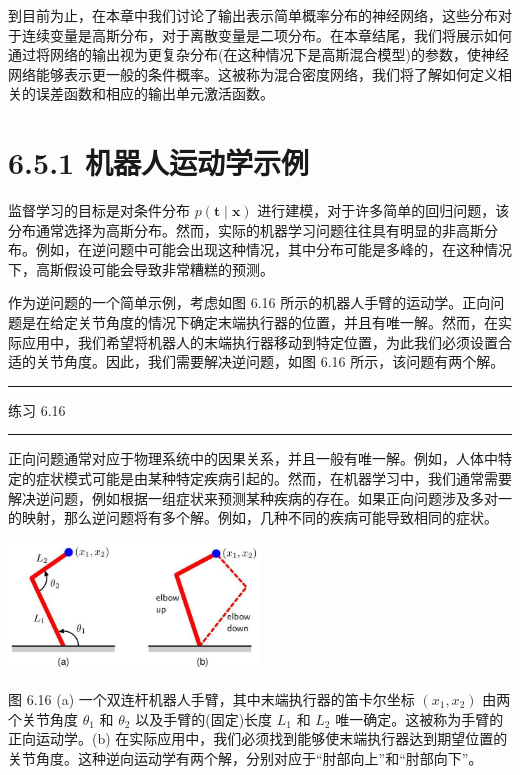 \documentclass[10pt]{article}
\newcommand{\HRule}{\begin{center}\rule{0.9\linewidth}{0.2mm}\end{center}}
\begin{document}
到目前为止，在本章中我们讨论了输出表示简单概率分布的神经网络，这些分布对于连续变量是高斯分布，对于离散变量是二项分布。在本章结尾，我们将展示如何通过将网络的输出视为更复杂分布(在这种情况下是高斯混合模型)的参数，使神经网络能够表示更一般的条件概率。这被称为混合密度网络，我们将了解如何定义相关的误差函数和相应的输出单元激活函数。

\section*{6.5.1 机器人运动学示例}

监督学习的目标是对条件分布 \(p\left( {\mathbf{t} \mid  \mathbf{x}}\right)\) 进行建模，对于许多简单的回归问题，该分布通常选择为高斯分布。然而，实际的机器学习问题往往具有明显的非高斯分布。例如，在逆问题中可能会出现这种情况，其中分布可能是多峰的，在这种情况下，高斯假设可能会导致非常糟糕的预测。

作为逆问题的一个简单示例，考虑如图 6.16 所示的机器人手臂的运动学。正向问题是在给定关节角度的情况下确定末端执行器的位置，并且有唯一解。然而，在实际应用中，我们希望将机器人的末端执行器移动到特定位置，为此我们必须设置合适的关节角度。因此，我们需要解决逆问题，如图 6.16 所示，该问题有两个解。

\HRule

练习 6.16

\HRule

正向问题通常对应于物理系统中的因果关系，并且一般有唯一解。例如，人体中特定的症状模式可能是由某种特定疾病引起的。然而，在机器学习中，我们通常需要解决逆问题，例如根据一组症状来预测某种疾病的存在。如果正向问题涉及多对一的映射，那么逆问题将有多个解。例如，几种不同的疾病可能导致相同的症状。

\begin{center}
\includegraphics[max width=0.5\textwidth]{images/0194e279-9b28-703a-88f4-c3ac21e2010d_218_698_343_718_369_0.jpg}
\end{center}
\hspace*{3em} 

图 6.16 (a) 一个双连杆机器人手臂，其中末端执行器的笛卡尔坐标 \(\left( {{x}_{1},{x}_{2}}\right)\) 由两个关节角度 \({\theta }_{1}\) 和 \({\theta }_{2}\) 以及手臂的(固定)长度 \({L}_{1}\) 和 \({L}_{2}\) 唯一确定。这被称为手臂的正向运动学。(b) 在实际应用中，我们必须找到能够使末端执行器达到期望位置的关节角度。这种逆向运动学有两个解，分别对应于“肘部向上”和“肘部向下”。
\end{document}
